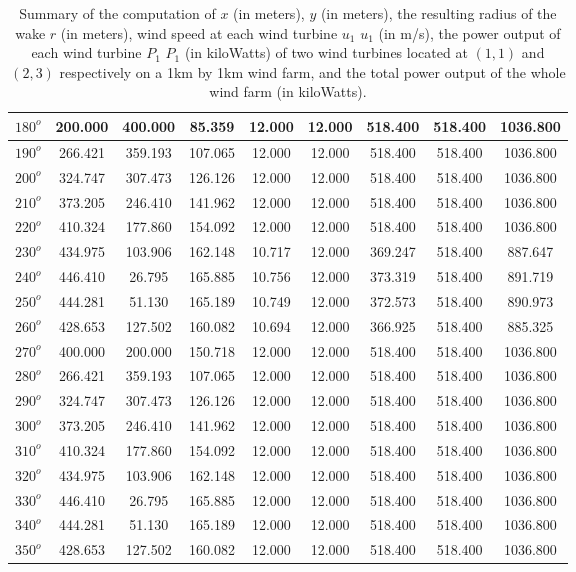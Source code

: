 \begin{table}[H]
\begin{tabular}{|c|c|c|c|c|c|c|c|c|}
$180^o$	&200.000	&400.000	&85.359	&12.000	&12.000	&518.400	&518.400	&1036.800 \\ \hline
$190^o$	&266.421	&359.193	&107.065	&12.000	&12.000	&518.400	&518.400	&1036.800 \\ \hline
$200^o$	&324.747	&307.473	&126.126	&12.000	&12.000	&518.400	&518.400	&1036.800 \\ \hline
$210^o$	&373.205	&246.410	&141.962	&12.000	&12.000	&518.400	&518.400	&1036.800 \\ \hline
$220^o$	&410.324	&177.860	&154.092	&12.000	&12.000	&518.400	&518.400	&1036.800 \\ \hline
$230^o$	&434.975	&103.906	&162.148	&10.717	&12.000	&369.247	&518.400	&887.647 \\ \hline
$240^o$	&446.410	&26.795	&165.885	&10.756	&12.000	&373.319	&518.400	&891.719 \\ \hline
$250^o$	&444.281	&51.130	&165.189	&10.749	&12.000	&372.573	&518.400	&890.973 \\ \hline
$260^o$	&428.653	&127.502	&160.082	&10.694	&12.000	&366.925	&518.400	&885.325 \\ \hline
$270^o$	&400.000	&200.000	&150.718	&12.000	&12.000	&518.400	&518.400	&1036.800 \\ \hline
$280^o$	&266.421	&359.193	&107.065	&12.000	&12.000	&518.400	&518.400	&1036.800 \\ \hline
$290^o$	&324.747	&307.473	&126.126	&12.000	&12.000	&518.400	&518.400	&1036.800 \\ \hline
$300^o$	&373.205	&246.410	&141.962	&12.000	&12.000	&518.400	&518.400	&1036.800 \\ \hline
$310^o$	&410.324	&177.860	&154.092	&12.000	&12.000	&518.400	&518.400	&1036.800 \\ \hline
$320^o$	&434.975	&103.906	&162.148	&12.000	&12.000	&518.400	&518.400	&1036.800 \\ \hline
$330^o$	&446.410	&26.795	&165.885	&12.000	&12.000	&518.400	&518.400	&1036.800 \\ \hline
$340^o$	&444.281	&51.130	&165.189	&12.000	&12.000	&518.400	&518.400	&1036.800 \\ \hline
$350^o$	&428.653	&127.502	&160.082	&12.000	&12.000	&518.400	&518.400	&1036.800 \\ \hline
        \end{tabular}
        \caption{Summary of the computation of $x$ (in meters), $y$ (in meters), the resulting radius of the wake $r$ (in meters), wind speed at each wind turbine $u_1$ $u_1$ (in m/s), the power output of each wind turbine $P_1$ $P_1$ (in kiloWatts) of two wind turbines located at $(1,1)$ and $(2,3)$ respectively on a 1km by 1km wind farm, and the total power output of the whole wind farm (in kiloWatts).}
        \label{summaryAvg1}
    \end{table}
    \doublespacing
    
